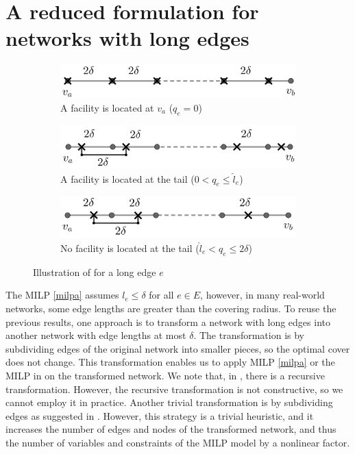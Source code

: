 \section{A reduced formulation for networks with long edges}\label{sec:reduced-milp}
\begin{figure}
	\begin{subfigure}{\textwidth}
    	\centering
    	\includegraphics[scale=1.15]{Chaptercflg/media/broken1.png}
    	\caption{A facility is located at $v_a$ ($q_e=0$)}
    	\label{fig:brokena}
	\end{subfigure}
	\vspace{0.25cm}
    
 	\begin{subfigure}{0.45\textwidth}
    	\centering
    	\includegraphics[scale=1.1]{Chaptercflg/media/broken2.png}
    	\caption{A facility is located at the tail ($0<q_e\leq \hat{l}_e$)}
    	\label{fig:brokenb}
	\end{subfigure}
	\begin{subfigure}{0.45\textwidth}
    	\centering
    	\includegraphics[scale=1.1]{Chaptercflg/media/broken3.png}
    	\caption{No facility is located at the tail ($\hat{l}_e <q_e\leq 2\delta$)}
    	\label{fig:brokenc}
	\end{subfigure}
	\caption{Illustration of  for a long edge $e$}
	\label{fig:broken}
\end{figure}

The MILP \eqref{milpa} assumes $l_e \le \delta$ for all $e \in E$, however, in many real-world networks, some edge lengths are greater than the covering radius. To reuse the previous results, one approach is to transform a network with long edges into another network with edge lengths at most $\delta$. The transformation is by subdividing edges of the original network into smaller pieces, so the optimal cover does not change. This transformation enables us to apply MILP \eqref{milpa} or the MILP in \cite{Hamacher20} on the transformed network. We note that, in \cite{Hamacher20}, there is a recursive transformation. However, the recursive transformation is not constructive, so we cannot employ it in practice.  Another trivial transformation is by subdividing edges as suggested in .  However, this strategy is a trivial heuristic, and it increases the number of edges and nodes of the transformed network, and thus the number of variables and constraints of the MILP model by a nonlinear factor.

